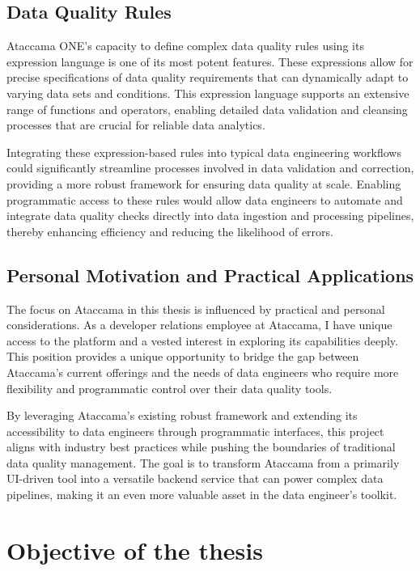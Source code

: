  \subsection{Data Quality Rules}
 
 Ataccama ONE's capacity to define complex data quality rules using its expression language is one of its most potent features. These expressions allow for precise specifications of data quality requirements that can dynamically adapt to varying data sets and conditions. This expression language supports an extensive range of functions and operators, enabling detailed data validation and cleansing processes that are crucial for reliable data analytics.
 
 Integrating these expression-based rules into typical data engineering workflows could significantly streamline processes involved in data validation and correction, providing a more robust framework for ensuring data quality at scale. Enabling programmatic access to these rules would allow data engineers to automate and integrate data quality checks directly into data ingestion and processing pipelines, thereby enhancing efficiency and reducing the likelihood of errors.
 
 \subsection{Personal Motivation and Practical Applications}
 
 The focus on Ataccama in this thesis is influenced by practical and personal considerations. As a developer relations employee at Ataccama, I have unique access to the platform and a vested interest in exploring its capabilities deeply. This position provides a unique opportunity to bridge the gap between Ataccama's current offerings and the needs of data engineers who require more flexibility and programmatic control over their data quality tools.
 
 By leveraging Ataccama's existing robust framework and extending its accessibility to data engineers through programmatic interfaces, this project aligns with industry best practices while pushing the boundaries of traditional data quality management. The goal is to transform Ataccama from a primarily UI-driven tool into a versatile backend service that can power complex data pipelines, making it an even more valuable asset in the data engineer's toolkit.

 \section{Objective of the thesis}

